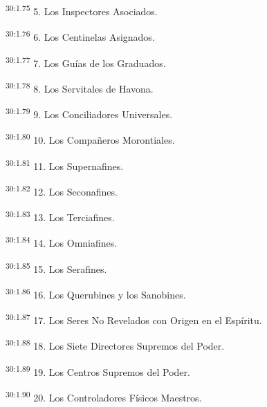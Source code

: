 \par
\textsuperscript{30:1.75} 5. Los Inspectores Asociados.

\par
\textsuperscript{30:1.76} 6. Los Centinelas Asignados.

\par
\textsuperscript{30:1.77} 7. Los Guías de los Graduados.

\par
\textsuperscript{30:1.78} 8. Los Servitales de Havona.

\par
\textsuperscript{30:1.79} 9. Los Conciliadores Universales.

\par
\textsuperscript{30:1.80} 10. Los Compañeros Morontiales.

\par
\textsuperscript{30:1.81} 11. Los Supernafines.

\par
\textsuperscript{30:1.82} 12. Los Seconafines.

\par
\textsuperscript{30:1.83} 13. Los Terciafines.

\par
\textsuperscript{30:1.84} 14. Los Omniafines.

\par
\textsuperscript{30:1.85} 15. Los Serafines.

\par
\textsuperscript{30:1.86} 16. Los Querubines y los Sanobines.

\par
\textsuperscript{30:1.87} 17. Los Seres No Revelados con Origen en el Espíritu.

\par
\textsuperscript{30:1.88} 18. Los Siete Directores Supremos del Poder.

\par
\textsuperscript{30:1.89} 19. Los Centros Supremos del Poder.

\par
\textsuperscript{30:1.90} 20. Los Controladores Físicos Maestros.

